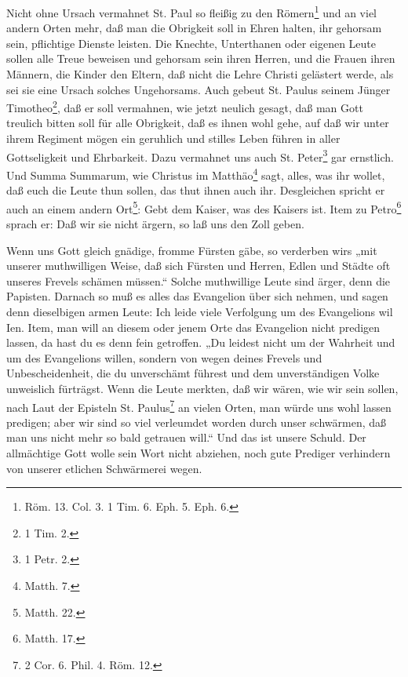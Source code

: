 Nicht ohne Ursach vermahnet St. Paul so fleißig zu den Römern\footnote{Röm. 13. Col. 3. 1 Tim. 6. Eph. 5. Eph. 6.} und an viel andern Orten mehr, daß man die Obrigkeit soll in Ehren halten, ihr gehorsam sein, pflichtige Dienste leisten. Die Knechte, Unterthanen oder eigenen Leute sollen alle Treue beweisen und gehorsam sein ihren Herren, und die Frauen ihren Männern, die Kinder den Eltern, daß nicht die Lehre Christi gelästert werde, als sei sie eine Ursach solches Ungehorsams. Auch gebeut St. Paulus seinem Jünger Timotheo\footnote{1 Tim. 2.}, daß er soll vermahnen, wie jetzt neulich gesagt, daß man Gott treulich bitten soll für alle Obrigkeit, daß es ihnen wohl gehe, auf daß wir unter ihrem Regiment mögen ein geruhlich und stilles Leben führen in aller Gottseligkeit und Ehrbarkeit. Dazu vermahnet uns auch St. Peter\footnote{1 Petr. 2.} gar ernstlich. Und Summa Summarum, wie Christus im Matthäo\footnote{Matth. 7.} sagt, alles, was ihr wollet, daß euch die Leute thun sollen, das thut ihnen auch ihr. Desgleichen spricht er auch an einem andern Ort\footnote{Matth. 22.}: Gebt dem Kaiser, was des Kaisers ist. Item zu Petro\footnote{Matth. 17.} sprach er: Daß wir sie nicht ärgern, so laß uns den Zoll geben.

Wenn uns Gott gleich gnädige, fromme Fürsten gäbe, so verderben wirs „mit unserer muthwilligen Weise, daß sich Fürsten und Herren, Edlen und Städte oft unseres Frevels schämen müssen.“ Solche muthwillige Leute sind ärger, denn die Papisten. Darnach so muß es alles das Evangelion über sich nehmen, und sagen denn dieselbigen armen Leute: Ich leide viele Verfolgung um des Evangelions wil%
Ien. Item, man will an diesem oder jenem Orte das Evangelion nicht predigen lassen, da hast du es denn fein getroffen. „Du leidest nicht um der Wahrheit und um des Evangelions willen, sondern von wegen deines Frevels und Unbescheidenheit, die du unverschämt führest und dem unverständigen Volke unweislich fürträgst. Wenn die Leute merkten, daß wir wären, wie wir sein sollen, nach Laut der Episteln St. Paulus\footnote{2 Cor. 6. Phil. 4. Röm. 12.} an vielen Orten, man würde uns wohl lassen predigen; aber wir sind so viel verleumdet worden durch unser schwärmen, daß man uns nicht mehr so bald getrauen will.“ Und das ist unsere Schuld. Der allmächtige Gott wolle sein Wort nicht abziehen, noch gute Prediger verhindern von unserer etlichen Schwärmerei wegen.

